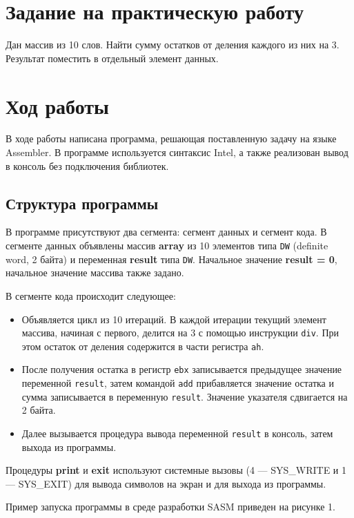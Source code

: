 \section{Задание на практическую работу}
Дан массив из 10 слов. Найти сумму остатков от деления каждого из них на 3. Результат поместить в отдельный элемент данных.



\section{Ход работы}
В ходе работы написана программа, решающая поставленную задачу на языке Assembler. В программе используется синтаксис Intel, а также реализован вывод в консоль без подключения библиотек.

\subsection{Структура программы}
В программе присутствуют два сегмента: сегмент данных и сегмент кода. В сегменте данных объявлены массив \textbf{array} из 10 элементов типа \texttt{DW} (definite word, 2 байта) и переменная \textbf{result} типа \texttt{DW}. Начальное значение \textbf{result = 0}, начальное значение массива также задано.

В сегменте кода происходит следующее:
\begin{itemize}
    \item Объявляется цикл из 10 итераций. В каждой итерации текущий элемент массива, начиная с первого, делится на 3 с помощью инструкции \texttt{div}. При этом остаток от деления содержится в части регистра \texttt{ah}. 
    \item После получения остатка в регистр \texttt{ebx} записывается предыдущее значение переменной \texttt{result}, затем командой \texttt{add} прибавляется значение остатка и сумма записывается в переменную \texttt{result}. Значение указателя сдвигается на 2 байта.
    \item Далее вызывается процедура вывода переменной \texttt{result} в консоль, затем выхода из программы.
\end{itemize}

Процедуры \textbf{print} и \textbf{exit} используют системные вызовы (4 — SYS\_WRITE и 1 — SYS\_EXIT) для вывода символов на экран и для выхода из программы.


Пример запуска программы в среде разработки SASM приведен на рисунке 1.


